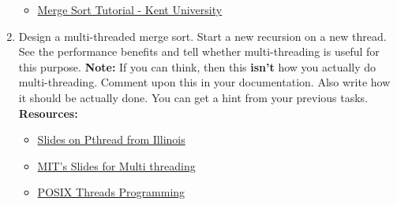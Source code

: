 \documentclass{article}
\begin{document}
\begin{enumerate}
    \begin{itemize}
        \item \href{http://www.personal.kent.edu/~rmuhamma/Algorithms/MyAlgorithms/Sorting/mergeSort.htm}{Merge Sort Tutorial - Kent University}

    \end{itemize}

\item Design a multi-threaded merge sort. Start a new recursion on a new thread. See the performance benefits and tell whether multi-threading is useful for this purpose.
{\newline}{\newline}
{\bf Note:} If you can think, then this {\bf isn't} how you actually do multi-threading. Comment upon this in your documentation. Also write how it should be actually done. You can get a hint from your previous tasks.
{\newline}{\newline}
{\bf Resources:}

    \begin{itemize}
        \item \href{https://courses.engr.illinois.edu/cs241/fa2010/ppt/10-pthread-examples.pdf}{Slides on Pthread from Illinois}
        \item \href{https://ocw.mit.edu/courses/electrical-engineering-and-computer-science/6-087-practical-programming-in-c-january-iap-2010/lecture-notes/MIT6_087IAP10_lec12.pdf}{MIT's Slides for Multi threading}
        \item \href{https://computing.llnl.gov/tutorials/pthreads/}{POSIX Threads Programming}
    \end{itemize}

\end{enumerate}%
\end{document}
